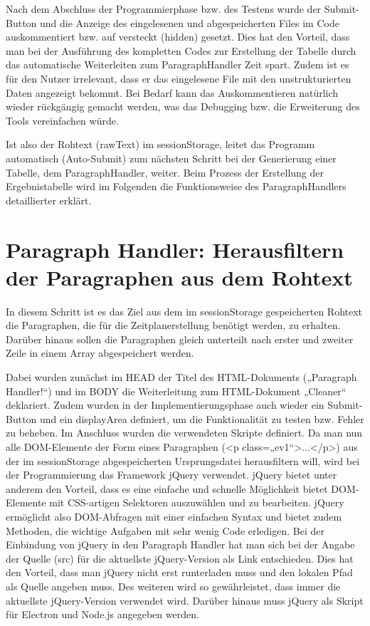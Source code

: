 { Nach dem Abschluss der Programmierphase bzw. des Testens wurde der Submit-Button und die Anzeige des eingelesenen und abgespeicherten Files im Code auskommentiert bzw. auf versteckt (hidden) gesetzt. Dies hat den Vorteil, dass man bei der Ausführung des kompletten Codes zur Erstellung der Tabelle durch das automatische Weiterleiten zum ParagraphHandler Zeit spart. Zudem ist es für den Nutzer irrelevant, dass er das eingelesene File mit den unstrukturierten Daten angezeigt bekommt. Bei Bedarf kann das Auskommentieren natürlich wieder rückgängig gemacht werden, was das Debugging bzw. die Erweiterung des Tools vereinfachen würde. 

Ist also der Rohtext (rawText) im sessionStorage, leitet das Programm automatisch (Auto-Submit) zum nächsten Schritt bei der Generierung einer Tabelle, dem ParagraphHandler, weiter. Beim Prozess der Erstellung der Ergebnistabelle wird im Folgenden die Funktionsweise des ParagraphHandlers detaillierter erklärt.

\section{Paragraph Handler: Herausfiltern der Paragraphen aus dem Rohtext }

In diesem Schritt ist es das Ziel aus dem im sessionStorage gespeicherten Rohtext die Paragraphen, die für die Zeitplanerstellung benötigt werden, zu erhalten. Darüber hinaus sollen die Paragraphen gleich unterteilt nach erster und zweiter Zeile in einem Array abgespeichert werden.

Dabei wurden zunächst im HEAD der Titel des HTML-Dokuments („Paragraph Handler!“) und im BODY die Weiterleitung zum HTML-Dokument „Cleaner“ deklariert. Zudem wurden in der Implementierungsphase auch wieder ein Submit-Button und ein displayArea definiert, um die Funktionalität zu testen bzw. Fehler zu beheben. Im Anschluss wurden die verwendeten Skripte definiert. Da man nun alle DOM-Elemente der Form eines Paragraphen (<p class=„ev1“>...</p>) aus der im sessionStorage abgespeicherten Ursprungsdatei herausfiltern will, wird bei der Programmierung das Framework jQuery verwendet. jQuery bietet unter anderem den Vorteil, dass es eine einfache und schnelle Möglichkeit bietet DOM-Elemente mit CSS-artigen Selektoren auszuwählen und zu bearbeiten. jQuery ermöglicht also DOM-Abfragen mit einer einfachen Syntax und bietet zudem Methoden, die wichtige Aufgaben mit sehr wenig Code erledigen. Bei der Einbindung von jQuery in den Paragraph Handler hat man sich bei der Angabe der Quelle (src) für die aktuellste jQuery-Version als Link entschieden. Dies hat den Vorteil, dass man jQuery nicht erst runterladen muss und den lokalen Pfad als Quelle angeben muss. Des weiteren wird so gewährleistet, dass immer die aktuellste jQuery-Version verwendet wird. Darüber hinaus muss jQuery als Skript für Electron und Node.js angegeben werden. 

}
